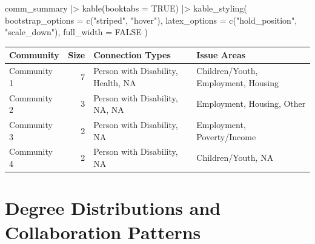 \documentclass[
  letterpaper,
  DIV=11,
  numbers=noendperiod]{scrartcl}
\newenvironment{Shaded}{\begin{snugshade}}{\end{snugshade}}
\newcommand{\AttributeTok}[1]{\textcolor[rgb]{0.40,0.45,0.13}{#1}}
\newcommand{\ConstantTok}[1]{\textcolor[rgb]{0.56,0.35,0.01}{#1}}
\newcommand{\FunctionTok}[1]{\textcolor[rgb]{0.28,0.35,0.67}{#1}}
\newcommand{\NormalTok}[1]{\textcolor[rgb]{0.00,0.23,0.31}{#1}}
\newcommand{\SpecialCharTok}[1]{\textcolor[rgb]{0.37,0.37,0.37}{#1}}
\newcommand{\StringTok}[1]{\textcolor[rgb]{0.13,0.47,0.30}{#1}}
\begin{document}
\begin{Shaded}
\begin{Highlighting}[]
\NormalTok{comm\_summary }\SpecialCharTok{|\textgreater{}}
  \FunctionTok{kable}\NormalTok{(}\AttributeTok{booktabs =} \ConstantTok{TRUE}\NormalTok{) }\SpecialCharTok{|\textgreater{}}
  \FunctionTok{kable\_styling}\NormalTok{(}
    \AttributeTok{bootstrap\_options =} \FunctionTok{c}\NormalTok{(}\StringTok{"striped"}\NormalTok{, }\StringTok{"hover"}\NormalTok{),}
    \AttributeTok{latex\_options =} \FunctionTok{c}\NormalTok{(}\StringTok{"hold\_position"}\NormalTok{, }\StringTok{"scale\_down"}\NormalTok{),}
    \AttributeTok{full\_width =} \ConstantTok{FALSE}
\NormalTok{  )}
\end{Highlighting}
\end{Shaded}

\begin{longtable*}[t]{lrll}
\toprule
Community & Size & Connection Types & Issue Areas\\
\midrule
Community 1 & 7 & Person with Disability, Health, NA & Children/Youth, Employment, Housing\\
Community 2 & 3 & Person with Disability, NA, NA & Employment, Housing, Other\\
Community 3 & 2 & Person with Disability, NA & Employment, Poverty/Income\\
Community 4 & 2 & Person with Disability, NA & Children/Youth, NA\\
\bottomrule
\end{longtable*}

\section{Degree Distributions and Collaboration
Patterns}\label{degree-distributions-and-collaboration-patterns}
\end{document}
